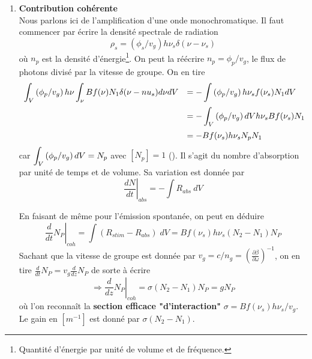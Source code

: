 \begin{enumerate}
\item \textbf{Contribution cohérente}\\
Nous parlons ici de l'amplification d'une onde monochromatique. Il faut commencer par écrire la densité
spectrale de radiation
\begin{equation}
{\rho _s} = ({\phi _s}/{v_g})h{\nu _s}\delta (\nu  - {\nu _s})
\end{equation}
où $n_p$ est la densité d'énergie\footnote{Quantité d'énergie par unité de volume et de fréquence.}. On
peut la réécrire $n_p=\phi_p/v_g$, le flux de photons divisé par la vitesse de groupe. On en tire
\begin{equation}
\begin{array}{ll}
\DS\int_V \left(\phi_p/v_g\right) h\nu \int_\nu Bf(\nu)N_1 \delta(\nu-nu_s) d\nu dV &=\DS -\int \left(\phi_p/v_g\right) h\nu_s f(\nu_s)N_1 dV\vspace{2mm}\\
&=\DS -\int_V \left(\phi_p/v_g\right)dV h\nu_sBf(\nu_s)N_1\vspace{2mm}\\
&=\DS-Bf(\nu_s)h\nu_s N_p N_1
\end{array}
\end{equation}
car $\displaystyle\int_V \left(\phi_p/v_g\right) dV = N_p$ avec $[N_p] = 1$ (\danger). Il s'agit du nombre d'absorption
par unité de temps et de volume. Sa variation est donnée par
\begin{equation}
\left.\dfrac{dN}{dt}\right|_{abs} = -\int R_{abs}\ dV
\end{equation}

En faisant de même pour l'émission spontanée, on peut en déduire
\begin{equation}
{\left. {\frac{d}{{dt}}{N_P}} \right|_{coh}} = \int {({R_{stim}} - {R_{abs}})} \;dV = Bf({\nu _s})h{\nu _s}({N_2} - {N_1}){N_P}
\end{equation}
Sachant que la vitesse de groupe est donnée par ${v_g} = c/{n_g} = {(\frac{{\partial \beta }}{{\partial \omega
 }})^{ - 1}}$, on en tire $\frac{d}{{dt}}{N_P} = {v_g}\frac{d}{{dz}}{N_P}$ de sorte à écrire
\begin{equation}
{\left. { \Rightarrow \frac{d}{{dz}}{N_P}} \right|_{coh}} = \sigma ({N_2} - {N_1}){N_P} = g{N_P}
\end{equation}
où l'on reconnaît la \textbf{section efficace "d'interaction"} $\sigma  = Bf({\nu _s})h{\nu _s}/{v_g}$. Le 
gain en $[m^{-1}]$ est donné par $\sigma(N_2-N_1)$.\\


\end{enumerate}
